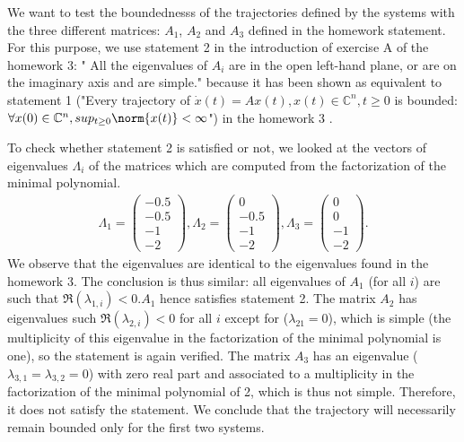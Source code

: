 \documentclass[11pt]{article}
\newcommand{\complex}{\mathbb{C}} %
\begin{document}
We want to test the boundednesss of the trajectories defined by the systems with the three different matrices: $A_1$, $A_2$ and $A_3$ defined in the homework statement. For this purpose, we use statement 2 in the introduction of exercise A of the homework 3: " All the eigenvalues of $A_{i}$ are in the open left-hand plane, or are on the imaginary axis and are simple." because it has been shown as equivalent to statement 1 ("Every trajectory of $\dot{x}(t) = A x(t), x(t) \in \complex^{n}, t\geq 0$ is bounded: $\forall x(0) \in \complex^{n}, sup_{t\geq0} \norm{x(t)} < \infty$") in the homework 3 .

To check whether statement 2 is satisfied or not, we looked at the vectors of eigenvalues $\Lambda_i$ of the matrices which are computed from the factorization of the minimal polynomial.
\begin{align*}
    \Lambda_1 =\begin{pmatrix}
    -0.5\\
    -0.5\\
    -1\\
    -2
    \end{pmatrix},
    \Lambda_2 =\begin{pmatrix}
    0\\
    -0.5\\
    -1\\
    -2
    \end{pmatrix},
    \Lambda_3 =\begin{pmatrix}
    0\\
    0\\
    -1\\
    -2
    \end{pmatrix}.
\end{align*}
We observe that the eigenvalues are identical to the eigenvalues found in the homework 3. The conclusion is thus similar: all eigenvalues of $A_1$ (for all \(i\)) are such that $\Re(\lambda_{1, i})<0$.$A_1$ hence satisfies statement 2.
The matrix $A_2$ has eigenvalues such $\Re(\lambda_{2, i})<0$ for all \(i\) except for ($\lambda_{21}=0$), which is simple (the multiplicity of this eigenvalue in the factorization of the minimal polynomial is one), so the statement is again verified.
The matrix $A_3$ has an eigenvalue ($\lambda_{3, 1} = \lambda_{3, 2} = 0$) with zero real part and associated to a multiplicity in the factorization of the minimal polynomial of 2, which is thus not simple.
Therefore, it does not satisfy the statement. We conclude that the trajectory will necessarily remain bounded only for the first two systems.
\end{document}
